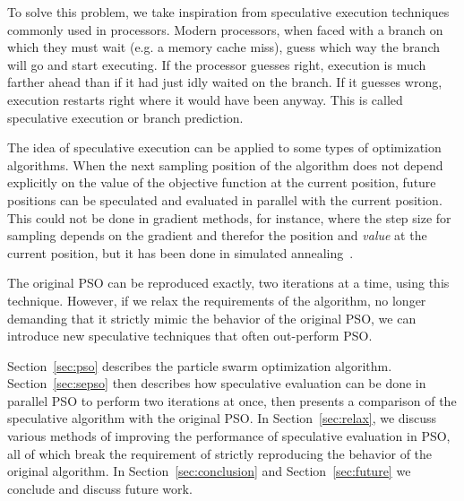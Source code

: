 \documentclass[journal,letterpaper]{IEEEtran}
\renewcommand{\sec}[1]{Section~\ref{sec:#1}}
\begin{document}
To solve this problem, we take inspiration from speculative execution
techniques commonly used in processors.  Modern processors, when faced with a
branch on which they must wait (e.g. a memory cache miss), guess which way the
branch will go and start executing.  If the processor guesses right, execution
is much farther ahead than if it had just idly waited on the branch.  If it
guesses wrong, execution restarts right where it would have been anyway.  This
is called speculative execution or branch prediction.

The idea of speculative execution can be applied to some types of optimization
algorithms.  When the next sampling position of the algorithm does not depend
explicitly on the value of the objective function at the current position,
future positions can be speculated and evaluated in parallel with the current
position.  This could not be done in gradient methods, for instance, where the
step size for sampling depends on the gradient and therefor the position and \emph{value}
at the current position, but it
has been done in simulated annealing~\cite{witte-tpds91}.

% 
% 

The original PSO can be reproduced exactly, two iterations at a time, using
this technique.  However, if we relax the requirements of the algorithm, no
longer demanding that it strictly mimic the behavior of the original PSO, we
can introduce new speculative techniques that often out-perform PSO.  

\sec{pso} describes the particle swarm optimization algorithm.  \sec{sepso}
then describes how speculative evaluation can be done in parallel PSO to
perform two iterations at once, then presents a comparison of the speculative
algorithm with the original PSO.  In \sec{relax}, we discuss various methods of
improving the performance of speculative evaluation in PSO, all of which break
the requirement of strictly reproducing the behavior of the original algorithm.
In \sec{conclusion} and \sec{future} we conclude and discuss future work.
\end{document}
